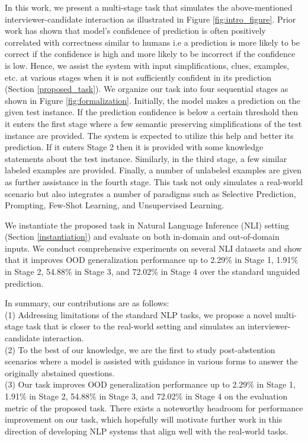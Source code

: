 \documentclass[11pt,a4paper]{article}
\newcommand{\Neeraj}[1]{{\small \color{red} [Neeraj: #1]}}
\begin{document}
In this work, we present a multi-stage task that simulates the above-mentioned interviewer-candidate interaction as illustrated in Figure \ref{fig:intro_figure}.
Prior work has shown that model's confidence of prediction is often positively correlated with correctness similar to humans \cite{hendrycks17baseline,NIPS2017_9ef2ed4b} i.e a prediction is more likely to be correct if the confidence is high and more likely to be incorrect if the confidence is low.
Hence, we assist the system with input simplifications, clues, examples, etc. at various stages when it is not sufficiently confident in its prediction (Section \ref{proposed_task}). 
We organize our task into four sequential stages as shown in Figure \ref{fig:formalization}.
Initially, the model makes a prediction on the given test instance.
If the prediction confidence is below a certain threshold then it enters the first stage where a few semantic preserving simplifications of the test instance are provided.
The system is expected to utilize this help and better its prediction. 
If it enters Stage 2 then it is provided with some knowledge statements about the test instance.
Similarly, in the third stage, a few similar labeled examples are provided.
Finally, a number of unlabeled examples are given as further assistance in the fourth stage.
This task not only simulates a real-world scenario but also integrates a number of paradigms such as Selective Prediction, Prompting, Few-Shot Learning, and Unsupervised Learning.

We instantiate the proposed task in Natural Language Inference (NLI) setting (Section \ref{instantiation}) and evaluate on both in-domain and out-of-domain inputs.
We conduct comprehensive experiments on several NLI datasets and show that it improves OOD generalization performance up to 2.29\% in Stage 1, 1.91\% in Stage 2, 54.88\% in Stage 3, and 72.02\% in Stage 4 over the standard unguided prediction. 

In summary, our contributions are as follows:\\
(1) Addressing limitations of the standard NLP tasks, we propose a novel multi-stage task that is closer to the real-world setting and simulates an interviewer-candidate interaction.\\
(2) To the best of our knowledge, we are the first to study post-abstention scenarios where a model is assisted with guidance in various forms to answer the originally abstained questions. \\
(3) Our task improves OOD generalization performance up to 2.29\% in Stage 1, 1.91\% in Stage 2, 54.88\% in Stage 3, and 72.02\% in Stage 4 on the evaluation metric of the proposed task. There exists a noteworthy headroom for performance improvement on our task, which hopefully will motivate further work in this direction of developing NLP systems that align well with the real-world tasks. \\
\end{document}
